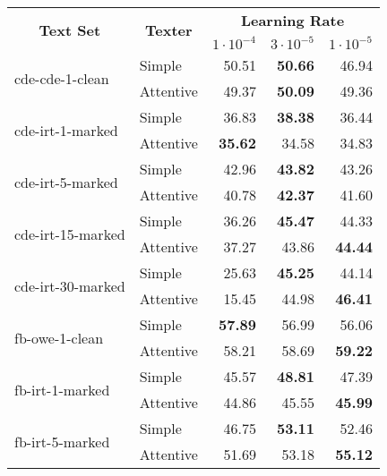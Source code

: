 \begin{tabular}{| l | l | r | r | r |}
    \hline

    \multicolumn{1}{|c|}{\multirow{2}{*}{\textbf{Text Set}}} &
    \multicolumn{1}{|c|}{\multirow{2}{*}{\textbf{Texter}}} &
    \multicolumn{3}{|c|}{\textbf{Learning Rate}} \\

    &
    &
    \multicolumn{1}{|c|}{\textbf{$1 \cdot 10^{-4}$}} &
    \multicolumn{1}{|c|}{\textbf{$3 \cdot 10^{-5}$}} &
    \multicolumn{1}{|c|}{\textbf{$1 \cdot 10^{-5}$}} \\

    \hline \hline

    \multirow{2}{*}{cde-cde-1-clean}
    & Simple & 50.51 & \textbf{50.66} & 46.94 \\
    & Attentive & 49.37 & \textbf{50.09} & 49.36 \\ \hline

    \multirow{2}{*}{cde-irt-1-marked}
    & Simple & 36.83 & \textbf{38.38} & 36.44 \\
    & Attentive & \textbf{35.62} & 34.58 & 34.83 \\ \hline

    \multirow{2}{*}{cde-irt-5-marked}
    & Simple & 42.96 & \textbf{43.82} & 43.26 \\
    & Attentive & 40.78 & \textbf{42.37} & 41.60 \\ \hline

    \multirow{2}{*}{cde-irt-15-marked}
    & Simple & 36.26 & \textbf{45.47} & 44.33 \\
    & Attentive & 37.27 & 43.86 & \textbf{44.44} \\ \hline

    \multirow{2}{*}{cde-irt-30-marked}
    & Simple & 25.63 & \textbf{45.25} & 44.14 \\
    & Attentive & 15.45 & 44.98 & \textbf{46.41} \\ \hline \hline

    \multirow{2}{*}{fb-owe-1-clean}
    & Simple & \textbf{57.89} & 56.99 & 56.06 \\
    & Attentive & 58.21 & 58.69 & \textbf{59.22} \\ \hline

    \multirow{2}{*}{fb-irt-1-marked}
    & Simple & 45.57 & \textbf{48.81} & 47.39 \\
    & Attentive & 44.86 & 45.55 & \textbf{45.99} \\ \hline

    \multirow{2}{*}{fb-irt-5-marked}
    & Simple & 46.75 & \textbf{53.11} & 52.46 \\
    & Attentive & 51.69 & 53.18 & \textbf{55.12} \\ \hline


\end{tabular}
